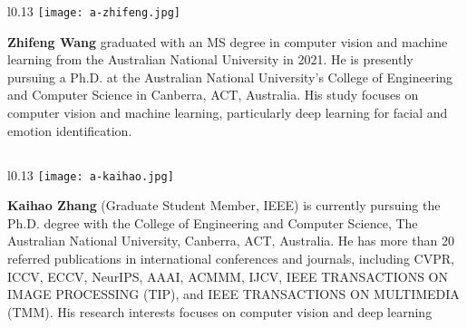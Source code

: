 \documentclass[review,12pt, 3p]{elsarticle}
\begin{document}













\newpage
\setlength\intextsep{0pt} \begin{wrapfigure}{l}{0.13\textwidth}
        \centering
        \texttt{[image: a-zhifeng.jpg]}
\end{wrapfigure}
\noindent \textbf{Zhifeng Wang} graduated with an MS degree in computer vision and machine learning from the Australian National University in 2021. He is presently pursuing a Ph.D. at the Australian National University's College of Engineering and Computer Science in Canberra, ACT, Australia. His study focuses on computer vision and machine learning, particularly deep learning for facial and emotion identification.

\subsection*{  } 
\setlength\intextsep{0pt} \begin{wrapfigure}{l}{0.13\textwidth}
        \centering
        \texttt{[image: a-kaihao.jpg]}
\end{wrapfigure}
\noindent \textbf{Kaihao Zhang} (Graduate Student Member, IEEE) is currently pursuing the Ph.D. degree with the College of Engineering and Computer Science, The Australian National University, Canberra, ACT, Australia. He has more than 20 referred publications in international conferences and journals, including CVPR, ICCV, ECCV, NeurIPS, AAAI, ACMMM, IJCV, IEEE TRANSACTIONS ON IMAGE PROCESSING (TIP), and IEEE TRANSACTIONS ON MULTIMEDIA (TMM). His research interests focuses on
computer vision and deep learning
\end{document}
